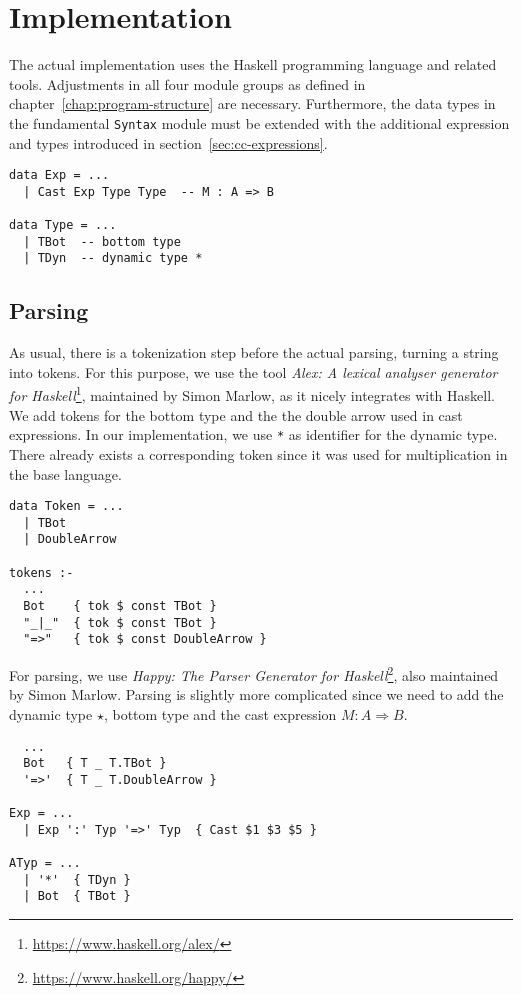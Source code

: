 \chapter{Implementation}\label{chap:implementation}

The actual implementation uses the Haskell programming language and related tools. Adjustments in all four module groups as defined in chapter~\ref{chap:program-structure} are necessary. Furthermore, the data types in the fundamental \texttt{Syntax} module must be extended with the additional expression and types introduced in section~\ref{sec:cc-expressions}.

\begin{lstlisting}[caption=Syntax.hs]
data Exp = ...
  | Cast Exp Type Type  -- M : A => B

data Type = ...
  | TBot  -- bottom type
  | TDyn  -- dynamic type *
\end{lstlisting}

\section{Parsing}

As usual, there is a tokenization step before the actual parsing, turning a string into tokens. For this purpose, we use the tool \emph{Alex: A lexical analyser generator for Haskell}\footnote{\url{https://www.haskell.org/alex/}}, maintained by Simon Marlow, as it nicely integrates with Haskell. We add tokens for the bottom type and the the double arrow used in cast expressions. In our implementation, we use \texttt{*} as identifier for the dynamic type. There already exists a corresponding token since it was used for multiplication in the base language.

\begin{lstlisting}[caption=Parsing/Tokens.x]
data Token = ...
  | TBot
  | DoubleArrow

tokens :-
  ...
  Bot    { tok $ const TBot }
  "_|_"  { tok $ const TBot }
  "=>"   { tok $ const DoubleArrow }
\end{lstlisting}

For parsing, we use \emph{Happy: The Parser Generator for Haskell}\footnote{\url{https://www.haskell.org/happy/}}, also maintained by Simon Marlow. Parsing is slightly more complicated since we need to add the dynamic type $\star$, bottom type and the cast expression $M : A \Rightarrow B$.

\begin{lstlisting}[caption=Parsing/Grammar.y]
%token
  ...
  Bot   { T _ T.TBot }
  '=>'  { T _ T.DoubleArrow }

Exp = ...
  | Exp ':' Typ '=>' Typ  { Cast $1 $3 $5 }

ATyp = ...
  | '*'  { TDyn }
  | Bot  { TBot }
\end{lstlisting}


